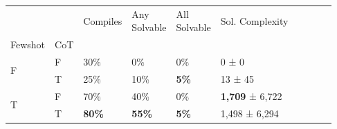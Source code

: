 \begin{tabular}{llllllllll}
\toprule
 &  & Compiles & \makecell{Any\\Solvable} & \makecell{All\\Solvable} & Sol. Complexity \\
Fewshot & CoT &  &  &  &  \\
\midrule
\multirow[t]{2}{*}{F} & F & 30\% & 0\% & 0\% & 0 ± 0 \\
 & T & 25\% & 10\% & \textbf{5\%} & 13 ± 45 \\
\cline{1-6}
\multirow[t]{2}{*}{T} & F & 70\% & 40\% & 0\% & \textbf{1,709} ± 6,722  \\
 & T & \textbf{80\%} & \textbf{55\%} & \textbf{5\%} & 1,498 ± 6,294 \\
\bottomrule
\end{tabular}
